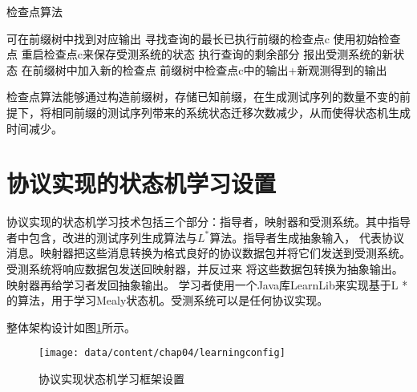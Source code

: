 \begin{algorithm}[htbp]
	\caption{检查点算法}
    \label{checkpoint}
    \begin{algorithmic}[1]%
        \STATE 可在前缀树中找到对应输出
        \ELSE
        \STATE 寻找查询的最长已执行前缀的检查点c
        	\STATE 使用初始检查点
        	\ENDIF
        	\STATE 重启检查点c来保存受测系统的状态
        	\STATE 执行查询的剩余部分
        		\STATE 报出受测系统的新状态
        		\STATE 在前缀树中加入新的检查点
        		\ENDIF
        \RETURN
        \STATE 前缀树中检查点c中的输出+新观测得到的输出
        \ENDIF
    \end{algorithmic}
\end{algorithm}


检查点算法能够通过构造前缀树，存储已知前缀，在生成测试序列的数量不变的前提下，将相同前缀的测试序列带来的系统状态迁移次数减少，从而使得状态机生成时间减少。



\section{协议实现的状态机学习设置}

协议实现的状态机学习技术包括三个部分：指导者，映射器和受测系统。其中指导者中包含，改进的测试序列生成算法与$L^{*}$算法。指导者生成抽象输入，
代表协议消息。映射器把这些消息转换为格式良好的协议数据包并将它们发送到受测系统。 受测系统将响应数据包发送回映射器，并反过来
将这些数据包转换为抽象输出。 映射器再给学习者发回抽象输出。
学习者使用一个Java库LearnLib来实现基于L *的算法，用于学习Mealy状态机。受测系统可以是任何协议实现。





整体架构设计如图\ref{fig-learningset}所示。

\begin{figure}[htp]
	\centering
	\texttt{[image: data/content/chap04/learningconfig]}
	\caption{协议实现状态机学习框架设置}
	\label{fig-learningset}
\end{figure}

